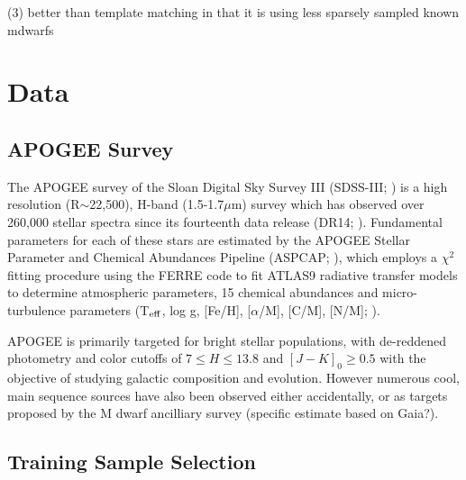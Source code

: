 \documentclass[modern]{aastex62}
\begin{document}
 (3) better than template matching in that it is using less sparsely sampled known mdwarfs




\section{Data} \label{sec:data}

\subsection{APOGEE Survey}


The APOGEE survey \citep{Majewski:2015} of the Sloan Digital Sky Survey III (SDSS-III; \citealt{Eisenstein:2011}) is a high resolution (R$\sim$22,500), H-band (1.5-1.7$\mu$m) survey which has observed over 260,000 stellar spectra since its fourteenth data release (DR14; \citealt{Abolfathi:2017}). Fundamental parameters for each of these stars are estimated by the APOGEE Stellar Parameter and Chemical Abundances Pipeline (ASPCAP; \citealt{Perez:2016}), which employs a $\chi^2$ fitting procedure using the FERRE code to fit ATLAS9 radiative transfer models \citep{Castelli:2004} to determine atmospheric parameters, 15 chemical abundances and micro-turbulence parameters (T$_{\rm eff}$, log g, [Fe/H], [$\alpha$/M], [C/M], [N/M]; \citealt{Meszaros:2012}). 

APOGEE is primarily targeted for bright stellar populations, with de-reddened photometry and color cutoffs of $7 \leq H \leq 13.8$ and $[J-K]_0 \geq 0.5$ \citep{Zasowski:2013} with the objective of studying galactic composition and evolution. However numerous cool, main sequence sources have also been observed either accidentally, or as targets proposed by the M dwarf ancilliary survey \citep{Desphande:2013} (specific estimate based on Gaia?).


\subsection{Training Sample Selection}
\end{document}
